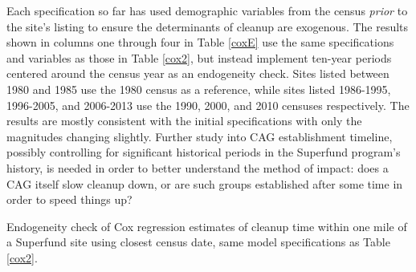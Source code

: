\documentclass[12pt]{article}
\begin{document}
{Each specification so far has used demographic variables from the census \emph{prior} to the site's listing to ensure the determinants of cleanup are exogenous. The results shown in columns one through four in Table \ref{coxE} use the same specifications and variables as those in Table \ref{cox2}, but instead implement ten-year periods centered around the census year as an endogeneity check. Sites listed between 1980 and 1985 use the 1980 census as a reference, while sites listed 1986-1995, 1996-2005, and 2006-2013 use the 1990, 2000, and 2010 censuses respectively. The results are mostly consistent with the initial specifications with only the magnitudes changing slightly. Further study into CAG establishment timeline, possibly controlling for significant historical periods in the Superfund program's history, is needed in order to better understand the method of impact: does a CAG itself slow cleanup down, or are such groups established after some time in order to speed things up?

\begin{table}[H]
	\centering	
	\caption{Endogeneity check of Cox regression estimates of cleanup time within one mile of a Superfund site using closest census date, same model specifications as Table \ref{cox2}.} \label{coxE}
	\tabcolsep 9pt
	\scalebox{0.83}{
		
}
\end{table}}
\end{document}
